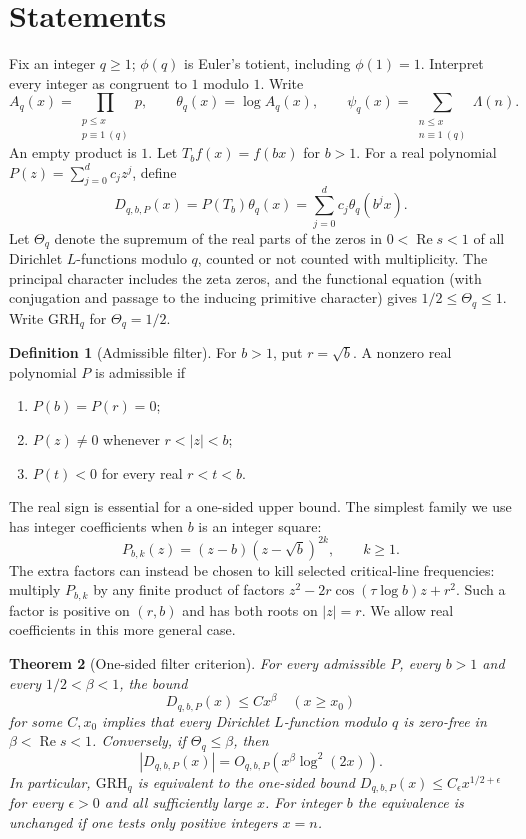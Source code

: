 \documentclass[11pt]{article}
\newtheorem{theorem}{Theorem}
\theoremstyle{definition}\newtheorem{definition}[theorem]{Definition}
\newcommand{\Rea}{\operatorname{Re}}
\newcommand{\GRH}{\mathrm{GRH}}
\newcommand{\thq}{\theta_q}
\newcommand{\psq}{\psi_q}
\begin{document}
\section{Statements}
Fix an integer $q\ge1$; $\phi(q)$ is Euler's totient, including $\phi(1)=1$. Interpret every integer as congruent to $1$ modulo $1$. Write
\[
 A_q(x)=\prod_{\substack{p\le x\\p\equiv1\ (q)}}p,\qquad
 \thq(x)=\log A_q(x),\qquad
 \psq(x)=\sum_{\substack{n\le x\\n\equiv1\ (q)}}\Lambda(n).
\]
An empty product is $1$. Let $T_bf(x)=f(bx)$ for $b>1$. For a real polynomial $P(z)=\sum_{j=0}^d c_jz^j$, define
\[
 D_{q,b,P}(x)=P(T_b)\thq(x)=\sum_{j=0}^d c_j\thq(b^j x).
\]
Let $\Theta_q$ denote the supremum of the real parts of the zeros in $0<\Rea s<1$ of all Dirichlet $L$-functions modulo $q$, counted or not counted with multiplicity. The principal character includes the zeta zeros, and the functional equation (with conjugation and passage to the inducing primitive character) gives $1/2\le\Theta_q\le1$. Write $\GRH_q$ for $\Theta_q=1/2$.

\begin{definition}[Admissible filter]
For $b>1$, put $r=\sqrt b$. A nonzero real polynomial $P$ is admissible if
\begin{enumerate}
\item $P(b)=P(r)=0$;
\item $P(z)\ne0$ whenever $r<|z|<b$;
\item $P(t)<0$ for every real $r<t<b$.
\end{enumerate}
\end{definition}
The real sign is essential for a one-sided upper bound. The simplest family we use has integer coefficients when $b$ is an integer square:
\[
 P_{b,k}(z)=(z-b)(z-\sqrt b)^{2k},\qquad k\ge1.
\]
The extra factors can instead be chosen to kill selected critical-line frequencies: multiply $P_{b,k}$ by any finite product of factors $z^2-2r\cos(\tau\log b)z+r^2$. Such a factor is positive on $(r,b)$ and has both roots on $|z|=r$. We allow real coefficients in this more general case.

\begin{theorem}[One-sided filter criterion]\label{thm:criterion}
For every admissible $P$, every $b>1$ and every $1/2<\beta<1$, the bound
\[
 D_{q,b,P}(x)\le C x^\beta\quad(x\ge x_0)
\]
for some $C,x_0$ implies that every Dirichlet $L$-function modulo $q$ is zero-free in $\beta<\Rea s<1$. Conversely, if $\Theta_q\le\beta$, then
\[
 |D_{q,b,P}(x)|=O_{q,b,P}(x^\beta\log^2(2x)).
\]
In particular, $\GRH_q$ is equivalent to the one-sided bound $D_{q,b,P}(x)\le C_\epsilon x^{1/2+\epsilon}$ for every $\epsilon>0$ and all sufficiently large $x$. For integer $b$ the equivalence is unchanged if one tests only positive integers $x=n$.
\end{theorem}
\end{document}
